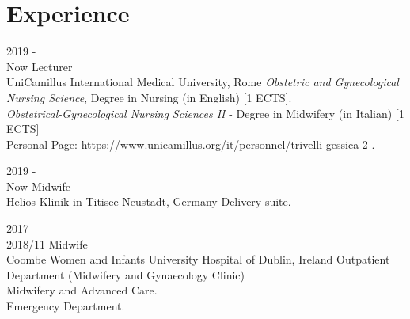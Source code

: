 \documentclass[11pt]{friggeri-cv}
\begin{document}
\section{Experience}
\begin{entrylist}
  \entry
      {2019 - \\Now}
      {Lecturer}
      {\\UniCamillus International Medical University, Rome}
      {
        \emph{Obstetric and Gynecological Nursing Science}, Degree in Nursing (in English) [1 ECTS].\\
        \emph{Obstetrical-Gynecological Nursing Sciences II} - Degree in Midwifery (in Italian) [1 ECTS] \\
        Personal Page:
        \footnotesize{\url{https://www.unicamillus.org/it/personnel/trivelli-gessica-2}} .
      }
      \newpage
      
  \entry
    {2019 - \\Now}
    {Midwife}
    {\\Helios Klinik in Titisee-Neustadt, Germany}
    {Delivery suite.}
  
  \entry
    {2017 - \\2018/11}
    {Midwife}
    {\\Coombe Women and Infants University Hospital of Dublin, Ireland}
    {Outpatient Department (Midwifery and Gynaecology Clinic)\\
     Midwifery and Advanced Care.\\
     Emergency Department.}
\end{entrylist}
\end{document}

